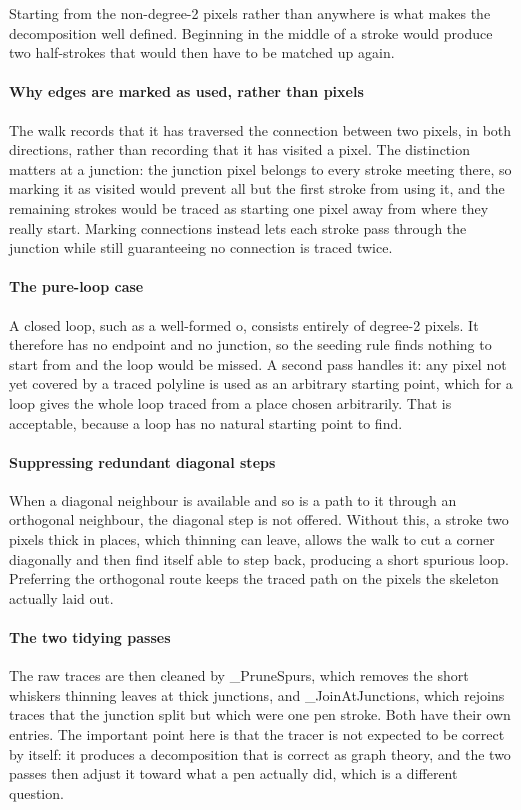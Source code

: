 Starting from the non-degree-2 pixels rather than anywhere is what makes the decomposition well defined. Beginning in the middle of a stroke would produce two half-strokes that would then have to be matched up again.


\paragraph{Why edges are marked as used, rather than pixels}
The walk records that it has traversed the connection between two pixels, in both directions, rather than recording that it has visited a pixel. The distinction matters at a junction: the junction pixel belongs to every stroke meeting there, so marking it as visited would prevent all but the first stroke from using it, and the remaining strokes would be traced as starting one pixel away from where they really start. Marking connections instead lets each stroke pass through the junction while still guaranteeing no connection is traced twice.


\paragraph{The pure-loop case}
A closed loop, such as a well-formed o, consists entirely of degree-2 pixels. It therefore has no endpoint and no junction, so the seeding rule finds nothing to start from and the loop would be missed. A second pass handles it: any pixel not yet covered by a traced polyline is used as an arbitrary starting point, which for a loop gives the whole loop traced from a place chosen arbitrarily. That is acceptable, because a loop has no natural starting point to find.


\paragraph{Suppressing redundant diagonal steps}
When a diagonal neighbour is available and so is a path to it through an orthogonal neighbour, the diagonal step is not offered. Without this, a stroke two pixels thick in places, which thinning can leave, allows the walk to cut a corner diagonally and then find itself able to step back, producing a short spurious loop. Preferring the orthogonal route keeps the traced path on the pixels the skeleton actually laid out.


\paragraph{The two tidying passes}
The raw traces are then cleaned by \_PruneSpurs, which removes the short whiskers thinning leaves at thick junctions, and \_JoinAtJunctions, which rejoins traces that the junction split but which were one pen stroke. Both have their own entries. The important point here is that the tracer is not expected to be correct by itself: it produces a decomposition that is correct as graph theory, and the two passes then adjust it toward what a pen actually did, which is a different question.


